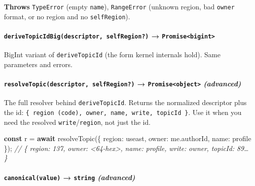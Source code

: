\documentclass[
  nobib]{tufte-handout}
\newenvironment{Shaded}{}{}
\newcommand{\AttributeTok}[1]{\textcolor[rgb]{0.49,0.56,0.16}{#1}}
\newcommand{\CommentTok}[1]{\textcolor[rgb]{0.38,0.63,0.69}{\textit{#1}}}
\newcommand{\ControlFlowTok}[1]{\textcolor[rgb]{0.00,0.44,0.13}{\textbf{#1}}}
\newcommand{\DataTypeTok}[1]{\textcolor[rgb]{0.56,0.13,0.00}{#1}}
\newcommand{\FunctionTok}[1]{\textcolor[rgb]{0.02,0.16,0.49}{#1}}
\newcommand{\KeywordTok}[1]{\textcolor[rgb]{0.00,0.44,0.13}{\textbf{#1}}}
\newcommand{\NormalTok}[1]{#1}
\newcommand{\OperatorTok}[1]{\textcolor[rgb]{0.40,0.40,0.40}{#1}}
\newcommand{\StringTok}[1]{\textcolor[rgb]{0.25,0.44,0.63}{#1}}
\begin{document}
\textbf{Throws} \texttt{TypeError} (empty \texttt{name}),
\texttt{RangeError} (unknown region, bad \texttt{owner} format, or no
region and no \texttt{selfRegion}).

\paragraph{\texorpdfstring{\texttt{deriveTopicIdBig(descriptor,\ selfRegion?)}
→
\texttt{Promise\textless{}bigint\textgreater{}}}{deriveTopicIdBig(descriptor, selfRegion?) → Promise\textless bigint\textgreater{}}}\label{derivetopicidbigdescriptor-selfregion-promisebigint}

BigInt variant of \texttt{deriveTopicId} (the form kernel internals
hold). Same parameters and errors.

\paragraph{\texorpdfstring{\texttt{resolveTopic(descriptor,\ selfRegion?)}
→ \texttt{Promise\textless{}object\textgreater{}}
\emph{(advanced)}}{resolveTopic(descriptor, selfRegion?) → Promise\textless object\textgreater{} (advanced)}}\label{resolvetopicdescriptor-selfregion-promiseobject-advanced}

The full resolver behind \texttt{deriveTopicId}. Returns the normalized
descriptor plus the id:
\texttt{\{\ region\ (code),\ owner,\ name,\ write,\ topicId\ \}}. Use it
when you need the resolved \texttt{write}/\texttt{region}, not just the
id.

\begin{Shaded}
\begin{Highlighting}[]
\KeywordTok{const}\NormalTok{ r }\OperatorTok{=} \ControlFlowTok{await} \FunctionTok{resolveTopic}\NormalTok{(\{ }\DataTypeTok{region}\OperatorTok{:} \StringTok{\textquotesingle{}useast\textquotesingle{}}\OperatorTok{,} \DataTypeTok{owner}\OperatorTok{:}\NormalTok{ me}\OperatorTok{.}\AttributeTok{authorId}\OperatorTok{,} \DataTypeTok{name}\OperatorTok{:} \StringTok{\textquotesingle{}profile\textquotesingle{}}\NormalTok{ \})}\OperatorTok{;}
\CommentTok{// \{ region: 137, owner: \textquotesingle{}\textless{}64{-}hex\textgreater{}\textquotesingle{}, name: \textquotesingle{}profile\textquotesingle{}, write: \textquotesingle{}owner\textquotesingle{}, topicId: \textquotesingle{}89…\textquotesingle{} \}}
\end{Highlighting}
\end{Shaded}

\paragraph{\texorpdfstring{\texttt{canonical(value)} → \texttt{string}
\emph{(advanced)}}{canonical(value) → string (advanced)}}\label{canonicalvalue-string-advanced}
\end{document}
